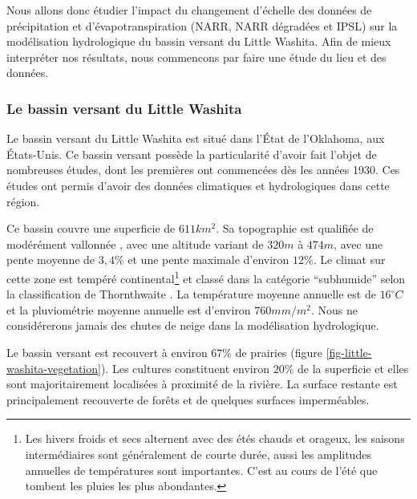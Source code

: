 \documentclass[a4paper,11pt]{article}
\numberwithin{equation}{section}
\begin{document}
Nous allons donc étudier l'impact du changement d'échelle des données de précipitation et d'évapotranspiration (NARR, NARR dégradées et IPSL) sur la modélisation hydrologique du bassin versant du Little Washita. Afin de mieux interpréter nos résultats, nous commencons par faire une étude du lieu et des données. 

\subsubsection{Le bassin versant du Little Washita}

Le bassin versant du Little Washita est situé dans l’État de l’Oklahoma, aux États-Unis. Ce bassin versant possède la particularité d’avoir fait l’objet de nombreuses études, dont les premières ont commencées dès les années 1930. Ces études ont permis d'avoir des données climatiques et hydrologiques dans cette région.

Ce bassin couvre une superficie de $611 km^2$. Sa topographie est qualifiée de modérément vallonnée \cite{allen1991hydrology}, avec une altitude variant de $320 m$ à $474 m$, avec une pente moyenne de $3,4 \%$ et une pente maximale d’environ $12 \%$. Le climat sur cette zone est tempéré continental\footnote{Les hivers froids et secs alternent avec des étés chauds et orageux, les saisons intermédiaires sont généralement de courte durée, aussi les amplitudes annuelles de températures sont importantes. C'est au cours de l'été que tombent les pluies les plus abondantes.} \cite{rosero2011ensemble} et classé dans la catégorie ``subhumide'' selon la classification de Thornthwaite \cite{allen1991hydrology}. La température moyenne annuelle est de $16^{\circ}C$ et la pluviométrie moyenne annuelle est d’environ $760 mm/m^2$. Nous ne considérerons jamais des chutes de neige dans la modélisation hydrologique.

Le bassin versant est recouvert à environ $67\%$ de prairies (figure \ref{fig-little-washita-vegetation}). Les cultures constituent environ $20\%$ de la superficie et elles sont majoritairement localisées à proximité de la rivière. La surface restante est principalement recouverte de forêts et de quelques surfaces imperméables. 
\end{document}
